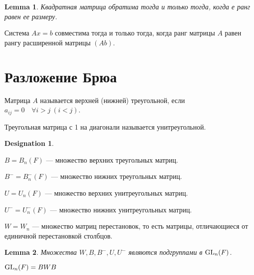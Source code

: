 \documentclass[11pt]{book}
\newcommand{\GL}{{\mathop{\text{\rm GL}}}}
\theoremstyle{definition}
\theoremstyle{plain}
\theoremstyle{plain}
\newtheorem{lm}{Lemma}
\theoremstyle{definition}
\newtheorem*{name}{Designation}
\theoremstyle{remark}
\begin{document}
\begin{lm}
    Квадратная матрица обратима тогда и только тогда, когда е ранг равен ее размеру.
\end{lm}
\begin{thm}
    Система $ Ax = b$ совместима  тогда и только тогда, когда ранг матрицы $ A$ равен рангу расширенной матрицы  $ \left( A b \right) $.
\end{thm}
\section{Разложение Брюа}
\begin{defn}
    Матрица $ A$ называется {\sf верхней (нижней) треугольной}, если $ a_{ij} = 0 \quad \forall i  > j ~(i < j)$.

    Треугольная матрица с 1 на диагонали называется {\sf унитреугольной}.
    \begin{name}
	$ $
	\begin{description}[noitemsep]
	    \item $ B = B_n(F)$ --- множество верхних треугольных матриц.
	    \item $ B^{-} = B_{n}^{-}(F)$ --- множество нижних треугольных матриц.
	    \item $ U = U_{n}(F)$ --- множество верхних унитреугольных матриц.
	    \item $ U^{-} = U^{-}_{n}(F)$ --- множество  нижних унитреугольных матриц.
	    \item $ W = W_n$ --- множество матриц перестановок, то есть матрицы, отличающиеся от единичной перестановкой столбцов.
	\end{description}
    \end{name}
\end{defn}
\begin{lm}
    Множества  $ W, B, B^{-}, U, U^{-}$ являются подгруппами в $ \GL_{n}(F)$.
\end{lm}
\begin{thm}
    $ \GL_n(F) = BWB$
\end{thm}
\end{document}
